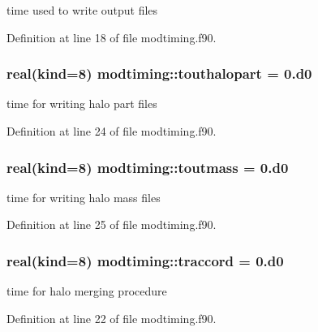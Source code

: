 time used to write output files 



Definition at line 18 of file modtiming.\+f90.

\subsubsection[{\texorpdfstring{touthalopart}{touthalopart}}]{\setlength{\rightskip}{0pt plus 5cm}real(kind=8) modtiming\+::touthalopart = 0.d0}\hypertarget{namespacemodtiming_ac41b305f5582ff3ca37058380003cfc7}{}\label{namespacemodtiming_ac41b305f5582ff3ca37058380003cfc7}


time for writing halo part files 



Definition at line 24 of file modtiming.\+f90.

\subsubsection[{\texorpdfstring{toutmass}{toutmass}}]{\setlength{\rightskip}{0pt plus 5cm}real(kind=8) modtiming\+::toutmass = 0.d0}\hypertarget{namespacemodtiming_a03a912e0243fcfbdec3ceeae3a34963a}{}\label{namespacemodtiming_a03a912e0243fcfbdec3ceeae3a34963a}


time for writing halo mass files 



Definition at line 25 of file modtiming.\+f90.

\subsubsection[{\texorpdfstring{traccord}{traccord}}]{\setlength{\rightskip}{0pt plus 5cm}real(kind=8) modtiming\+::traccord = 0.d0}\hypertarget{namespacemodtiming_a9b8eac461e18e3b6c057420bae5b004e}{}\label{namespacemodtiming_a9b8eac461e18e3b6c057420bae5b004e}


time for halo merging procedure 



Definition at line 22 of file modtiming.\+f90.

